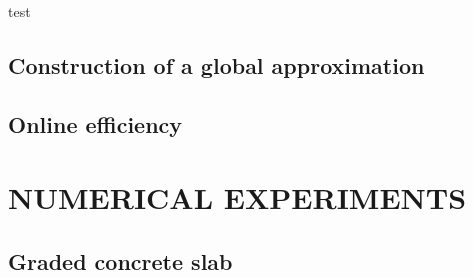 \documentclass[a4paper]{eccomas_paper-2024}
\begin{document}
test


\subsection{Construction of a global approximation} %
\label{sub:Construction of a global approximation}


\subsection{Online efficiency} %
\label{sub:Online efficiency}


\section{NUMERICAL EXPERIMENTS} %
\label{sec:numerical experiments}


\subsection{Graded concrete slab} %
\label{sub:Graded concrete slab}

%
%
%
\end{document}
